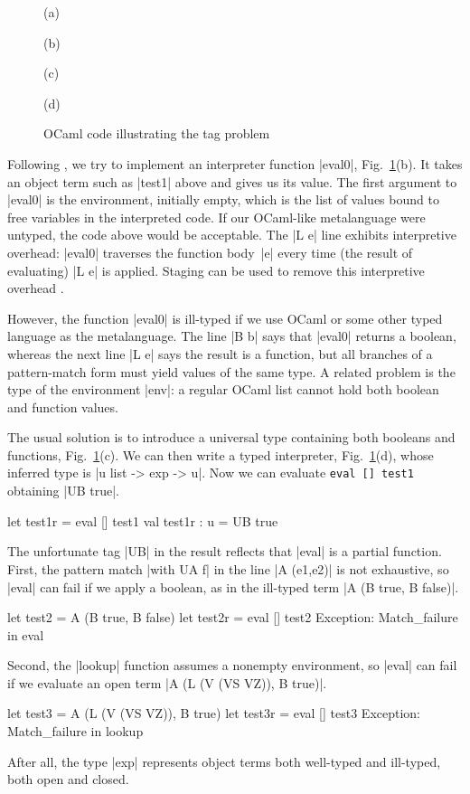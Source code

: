 \begin{figure}
%
(a) 

\smallskip
(b) 

\smallskip
(c) 

\smallskip
(d) 

\medskip
\caption{OCaml code illustrating the tag problem}
\label{fig:tag-problem}
\end{figure}

\fi
Following \citet{WalidICFP02},
we try to implement an interpreter function |eval0|\ifshort,
Fig.~\ref{fig:tag-problem}(b)\fi. It takes
an object term such as |test1| above and gives us its value.
The first argument to |eval0| is the environment, initially empty,
which is the list of values bound to free variables in the
interpreted code.
\ifshort\else{}\fi
If our OCaml-like metalanguage were untyped, the code above would be 
acceptable.
The |L e| line exhibits interpretive overhead:
|eval0| traverses the function body~|e| every time (the result of
evaluating) |L e| is applied. Staging can be used to remove this
interpretive overhead \citep[\S1.1--2]{WalidICFP02}.

However, the function |eval0| is ill-typed
if we use OCaml or some other typed language as the metalanguage.
The line |B b|
says that |eval0| returns a boolean, whereas the next line |L e| says
the result is a function, but all branches of a pattern-match form must
yield values of the same type. 
A related problem is the type of the environment |env|: a regular
OCaml list cannot hold both boolean and function values. 

The usual solution is to introduce a universal type \citep[\S1.3]
{WalidICFP02} containing both booleans and functions\ifshort,
Fig.~\ref{fig:tag-problem}(c)\fi.
\ifshort\else{}\fi
We can then write a typed interpreter\ifshort,
Fig.~\ref{fig:tag-problem}(d), \else{}\fi
whose inferred type is |u list -> exp -> u|. Now we can evaluate
\ifshort
\texttt{eval [] test1} obtaining |UB true|.
\else
\begin{code}
let test1r = eval [] test1
val test1r : u = UB true 
\end{code}
\fi
The unfortunate tag |UB| in the result reflects that |eval| is a partial
function.  
First, the pattern match |with UA f| in the line
|A (e1,e2)| is not exhaustive, so |eval| can fail if we apply a boolean,
as in the ill-typed term |A (B true, B false)|.
\ifshort\else
\begin{code}
let test2 = A (B true, B false)
let test2r = eval [] test2
Exception: Match_failure in eval
\end{code}
\fi
Second, the |lookup|
function assumes a nonempty environment, so |eval| can fail if we
evaluate an open term
\ifshort
|A (L (V (VS VZ)), B true)|.
\else
\begin{code}
let test3 = A (L (V (VS VZ)), B true)
let test3r = eval [] test3
Exception: Match_failure in lookup
\end{code}
\fi
After all, the type |exp| represents object
terms both well-typed and ill-typed, both open and closed.

